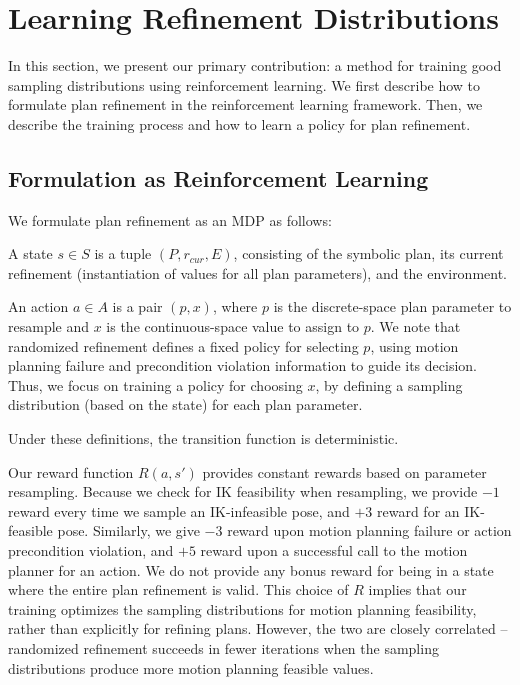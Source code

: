 \section{Learning Refinement Distributions}
In this section, we present our primary contribution: a method
for training good sampling distributions using reinforcement learning.
We first describe how to formulate plan refinement in the reinforcement
learning framework. Then, we describe the training process and how to learn
a policy for plan refinement.

\subsection{Formulation as Reinforcement Learning}
We formulate plan refinement as an MDP as follows:
\begin{tightlist}
\item A state $s \in S$ is a tuple $(P, r_{cur}, E)$, consisting of the
symbolic plan, its current refinement (instantiation of values for all plan parameters),
and the environment.
\item An action $a \in A$ is a pair $(p, x)$, where $p$ is the discrete-space plan
parameter to resample and $x$ is the continuous-space value to assign to $p$.
We note that randomized refinement defines a fixed policy for
selecting $p$, using motion planning failure and precondition violation information
to guide its decision. Thus, we focus on training a policy for choosing $x$,
by defining a sampling distribution (based on the state) for each plan parameter.
\item Under these definitions, the transition function is deterministic. 
\item Our reward function $R(a, s')$ provides constant rewards based on parameter resampling.
Because we check for IK feasibility when resampling, we provide $-1$ reward every
time we sample an IK-infeasible pose, and $+3$ reward for an IK-feasible pose.
Similarly, we give $-3$ reward upon motion planning failure or action precondition violation,
and $+5$ reward upon a successful call to the motion planner for an action. We do not
provide any bonus reward for being in a state where the entire plan refinement is valid.
This choice of $R$ implies that our training optimizes the sampling distributions for
motion planning feasibility, rather than explicitly for refining plans. However, the two are
closely correlated -- randomized refinement succeeds in fewer iterations when the sampling
distributions produce more motion planning feasible values.
\end{tightlist}

